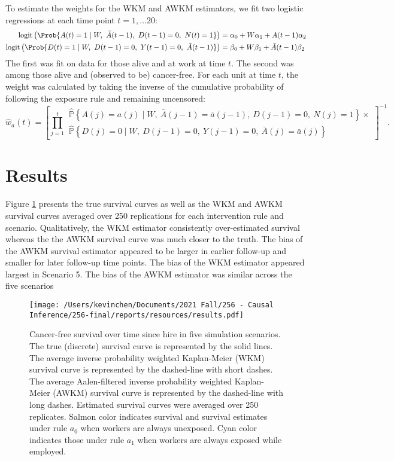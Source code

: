 \documentclass[
  11pt,
]{article}
\begin{document}
To estimate the weights for the WKM and AWKM estimators, we fit two
logistic regressions at each time point \(t = 1, \ldots 20\):
\[\begin{aligned}
\text{logit} \left(\Prob{
    A(t) = 1
    \mid W,\ \bar A(t - 1),\ D(t - 1) = 0,\ N(t) = 1
    }\right)
& = \alpha_0 + W \alpha_1 + A(t - 1) \alpha_2 \\
\text{logit} \left(\Prob{
    D(t) = 1
    \mid W,\ D(t - 1) = 0,\ Y(t - 1) = 0,\ \bar A(t - 1)}\right)
    & = \beta_0 + W \beta_1 + \bar A(t - 1) \beta_2
\end{aligned}\] The first was fit on data for those alive and at work at
time \(t\). The second was among those alive and (observed to be)
cancer-free. For each unit at time \(t\), the weight was calculated by
taking the inverse of the cumulative probability of following the
exposure rule and remaining uncensored: \[\hat w_{a} (t) =
    \left[
    \prod^t_{j = 1}
    \begin{aligned}
    \widehat {\mathbb P} \left\{
    A(j) = a(j) \mid W,\ \bar A(j - 1) = \bar a (j - 1),\ D(j - 1) = 0,\ N(j) = 1
    \right\} \times \\
    \widehat {\mathbb P} \left\{D(j) = 0
    \mid W,\ D(j - 1) = 0,\ Y(j - 1) = 0,\ \bar A(j) = \bar a (j) \right\}
    \end{aligned}\right]^{-1}.\]

\hypertarget{results}{%
\section{Results}\label{results}}

Figure \ref{fig:survival} presents the true survival curves as well as
the WKM and AWKM survival curves averaged over 250 replications for each
intervention rule and scenario. Qualitatively, the WKM estimator
consistently over-estimated survival whereas the the AWKM survival curve
was much closer to the truth. The bias of the AWKM survival estimator
appeared to be larger in earlier follow-up and smaller for later
follow-up time points. The bias of the WKM estimator appeared largest in
Scenario 5. The bias of the AWKM estimator was similar across the five
scenarios

\begin{figure}
\caption{Cancer-free survival over time since hire in five simulation scenarios. The true (discrete) survival curve is represented by the solid lines. The average inverse probability weighted Kaplan-Meier (WKM) survival curve is represented by the dashed-line with short dashes. The average Aalen-filtered inverse probability weighted Kaplan-Meier (AWKM) survival curve is represented by the dashed-line with long dashes. Estimated survival curves were averaged over 250 replicates. Salmon color indicates survival and survival estimates under rule $a_0$ when workers are always unexposed. Cyan color indicates those under rule $a_1$ when workers are always exposed while employed.}
\label{fig:survival}
\begin{center}
\texttt{[image: /Users/kevinchen/Documents/2021 Fall/256 - Causal Inference/256-final/reports/resources/results.pdf]}
\end{center}
\end{figure}
\end{document}
